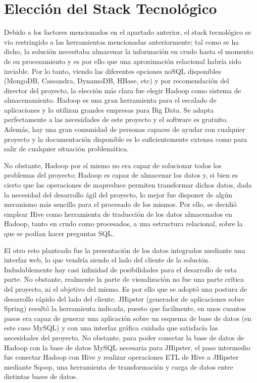 \section{Elección del Stack Tecnológico}
Debido a los factores mencionados en el apartado anterior, el stack tecnológico se vio restringido a las herramientas mencionadas anteriormente; tal como se ha dicho, la solución necesitaba almacenar la información en crudo hasta el momento de su procesamiento y es por ello que una aproximación relacional habría sido inviable. Por lo tanto, viendo las diferentes opciones noSQL disponibles (MongoDB, Cassandra, DynamoDB, HBase, etc) y por recomendación del director del proyecto, la elección más clara fue elegir Hadoop como sistema de almacenamiento. Hadoop es una gran herramienta para el escalado de aplicaciones y lo utilizan grandes empresas para Big Data. Se adapta perfectamente a las necesidades de este proyecto y el software es gratuito. Además, hay una gran comunidad de personas capaces de ayudar con cualquier proyecto y la documentación disponible es lo suficientemente extensa como para salir de cualquier situación problemática. \par
No obstante, Hadoop por sí mismo no era capaz de solucionar todos los problemas del proyecto; Hadoop es capaz de almacenar los datos y, si bien es cierto que las operaciones de mapreduce permiten transformar dichos datos, dada la necesidad del desarrollo ágil del proyecto, lo mejor fue disponer de algún mecanismo más sencillo para el procesado de los mismos. Por ello, se decidió emplear Hive como herramienta de traducción de los datos almacenados en Hadoop, tanto en crudo como procesados, a una estructura relacional, sobre la que se podían hacer preguntas SQL. \par
El otro reto planteado fue la presentación de los datos integrados mediante una interfaz web, lo que vendría siendo el lado del cliente de la solución. Indudablemente hay casi infinidad de posibilidades para el desarrollo de esta parte. No obstante, realmente la parte de visualización no fue una parte crítica del proyecto, ni el objetivo del mismo. Es por ello que se adoptó una postura de desarrollo rápido del lado del cliente. JHipster (generador de aplicaciones sobre Spring) resultó la herramienta indicada, puesto que facilmente, en unos cuantos pasos era capaz de generar una aplicación sobre un esquema de base de datos (en este caso MySQL) y con una interfaz gráfica cuidada que satisfacía las necesidades del proyecto. No obstante, para poder conectar la base de datos de Hadoop con la base de datos MySQL necesaria para JHipster, el paso intermedio fue conectar Hadoop con Hive y realizar operaciones ETL de Hive a JHipster mediante Sqoop, una herramienta de transformación y carga de datos entre distintas bases de datos.\par
